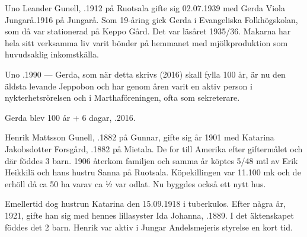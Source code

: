 %
Uno Leander Gunell, .1912 på Ruotsala gifte sig 02.07.1939 med Gerda Viola Jungarå.1916 på Jungarå. Som 19-åring gick Gerda i Evangeliska Folkhögskolan, som då var stationerad på Keppo Gård. Det var läsåret 1935/36. Makarna har hela sitt verksamma liv varit bönder på hemmanet med mjölkproduktion som huvudsaklig inkomstkälla.
\begin{jhchildren}
  \item {}
  \item {}
\end{jhchildren}

Uno .1990 ---  Gerda, som när detta skrivs (2016) skall fylla 100 år, är nu den äldsta levande Jeppobon och har genom åren varit en aktiv person i nykterhetsrörelsen och i Marthaföreningen, ofta som sekreterare.

Gerda blev 100 år + 6 dagar, .2016.



%


%
Henrik Mattsson Gunell, .1882 på Gunnar, gifte sig år 1901 med Katarina Jakobsdotter Forsgård, .1882 på Mietala. De for till Amerika efter giftermålet och där föddes 3 barn. 1906 återkom familjen och samma år köptes 5/48 mtl av Erik Heikkilä och hans hustru Sanna på Ruotsala. Köpekillingen var 11.100 mk och de erhöll då ca 50 ha varav ca ½ var odlat. Nu byggdes också ett nytt hus.

Emellertid dog hustrun Katarina den 15.09.1918 i tuberkulos. Efter några år, 1921, gifte han sig med hennes lillasyster Ida Johanna, .1889. I det äktenskapet föddes det 2 barn. Henrik var aktiv i Jungar Andelsmejeris styrelse en kort tid.
\begin{jhchildren}
  \item {}
  \item {}
  \item {}
  \item {}
  \item {}
  \item {}
  \item {}
\end{jhchildren}

